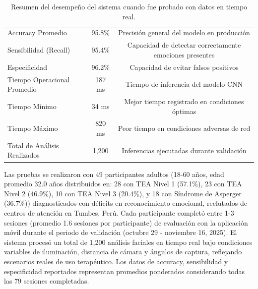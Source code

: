 \documentclass[journal,article,submit,pdftex,moreauthors]{Definitions/mdpi}
\begin{document}
	\begin{table}[H]
		\caption{Resumen del desempeño del sistema cuando fue probado con datos en tiempo real.\label{tab14}}
		\small
		\begin{tabularx}{\textwidth}{lcc}
			\toprule
			Accuracy Promedio & 95.8\% & Precisión general del modelo en producción \\
			Sensibilidad (Recall) & 95.4\% & Capacidad de detectar correctamente emociones presentes \\
			Especificidad & 96.2\% & Capacidad de evitar falsos positivos \\
			Tiempo Operacional Promedio & 187 ms & Tiempo de inferencia del modelo CNN \\
			Tiempo Mínimo & 34 ms & Mejor tiempo registrado en condiciones óptimas \\
			Tiempo Máximo & 820 ms & Peor tiempo en condiciones adversas de red \\
			Total de Análisis Realizados & 1,200 & Inferencias ejecutadas durante validación \\
			\bottomrule
		\end{tabularx}
	\end{table}
	
	Las pruebas se realizaron con 49 participantes adultos (18-60 años, edad promedio 32.0 años distribuidos en: 28 con TEA Nivel 1 (57.1\%), 23 con TEA Nivel 2 (46.9\%), 10 con TEA Nivel 3 (20.4\%), y 18 con Síndrome de Asperger (36.7\%)) diagnosticados con déficits en reconocimiento emocional, reclutados de centros de atención en Tumbes, Perú. Cada participante completó entre 1-3 sesiones (promedio 1.6 sesiones por participante) de evaluación con la aplicación móvil durante el periodo de validación (octubre 29 - noviembre 16, 2025). El sistema procesó un total de 1,200 análisis faciales en tiempo real bajo condiciones variables de iluminación, distancia de cámara y ángulos de captura, reflejando escenarios reales de uso terapéutico. Los datos de accuracy, sensibilidad y especificidad reportados representan promedios ponderados considerando todas las 79 sesiones completadas.
	
\end{document}
